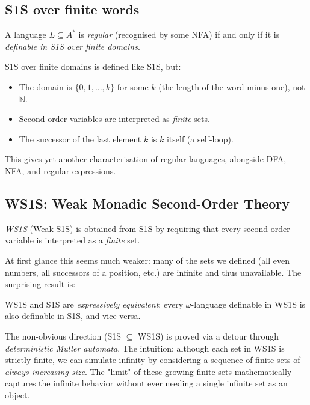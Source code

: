 \subsection{S1S over finite words}

\begin{theorem}
A language $L \subseteq A^*$ is \emph{regular} (recognised by some NFA)
if and only if it is \emph{definable in S1S over finite domains}.
\end{theorem}

S1S over finite domains is defined like S1S, but:
\begin{itemize}
  \item The domain is $\{0, 1, \ldots, k\}$ for some $k$ (the length
        of the word minus one), not $\mathbb{N}$.
  \item Second-order variables are interpreted as \emph{finite} sets.
  \item The successor of the last element $k$ is $k$ itself (a self-loop).
\end{itemize}
This gives yet another characterisation of regular languages, alongside
DFA, NFA, and regular expressions.

\subsection{WS1S: Weak Monadic Second-Order Theory}

\begin{definition}[WS1S]
\emph{WS1S} (Weak S1S) is obtained from S1S by requiring that every
second-order variable is interpreted as a \emph{finite} set.
\end{definition}

At first glance this seems much weaker: many of the sets we defined
(all even numbers, all successors of a position, etc.) are infinite
and thus unavailable.  The surprising result is:

\begin{theorem}
WS1S and S1S are \emph{expressively equivalent}: every $\omega$-language
definable in WS1S is also definable in S1S, and vice versa.
\end{theorem}

The non-obvious direction (S1S $\subseteq$ WS1S) is proved via a detour
through \emph{deterministic Muller automata}.  The intuition: although
each set in WS1S is strictly finite, we can simulate infinity by considering a sequence of finite sets of \emph{always increasing size}. The "limit" of these growing finite sets mathematically captures the infinite behavior without ever needing a single infinite set as an object.

